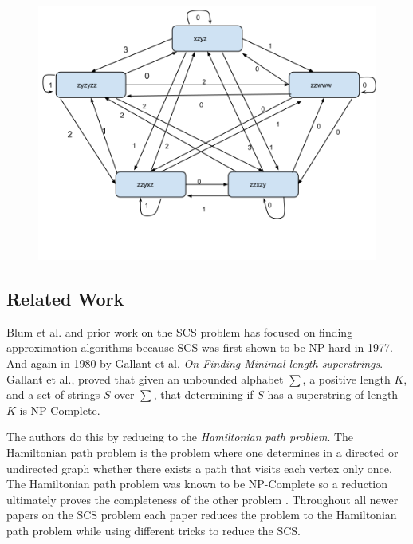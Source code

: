 \documentclass[letterpaper,11pt,titlepage]{article}
\begin{document}
\begin{figure}[h]
 \centering
   \includegraphics[width=.6\textwidth]{overlap.png}
\end{figure}


\newpage
\subsection*{Related Work}

Blum et al. and prior work on the SCS problem has focused on finding approximation algorithms because SCS was first shown to be NP-hard in 1977. And again in 1980 by Gallant et al. \textit{On Finding Minimal length superstrings}\cite{gallant1980finding}.  Gallant et al., proved that given an unbounded alphabet $\sum$, a positive length $K$, and a set of strings $S$ over $\sum$, that determining if $S$ has a superstring of length $K$ is NP-Complete.


 The authors do this by reducing to the \textit{Hamiltonian  path problem}. The Hamiltonian path problem is the problem where one determines in a directed or undirected graph whether there exists a path that visits each vertex only once. The Hamiltonian path problem was known to be NP-Complete so a reduction ultimately proves the completeness of the other problem \cite{michael1979computers}. Throughout all newer papers on the SCS problem each paper reduces the problem to the Hamiltonian path problem while using different tricks to reduce the SCS.\\
\end{document}
